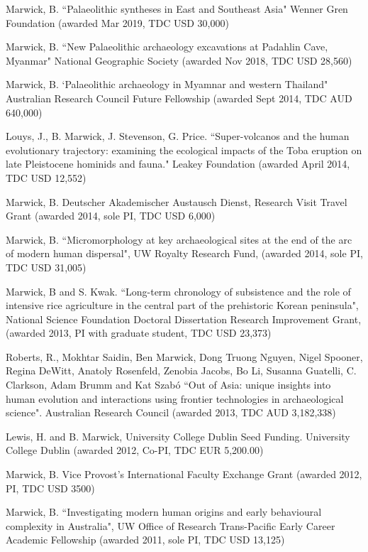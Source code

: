 \medskip

\ind  Marwick, B. ``Palaeolithic syntheses in East and Southeast Asia" Wenner Gren Foundation (awarded Mar 2019, TDC USD 30,000)

\ind  Marwick, B. ``New Palaeolithic archaeology excavations at Padahlin Cave, Myanmar" National Geographic Society (awarded Nov 2018, TDC USD 28,560)

\ind  Marwick, B. `Palaeolithic archaeology in Myamnar and western Thailand" Australian Research Council Future Fellowship (awarded Sept 2014, TDC AUD 640,000)

\ind  Louys, J., B. Marwick, J. Stevenson, G. Price. ``Super-volcanos and the human evolutionary trajectory: examining the ecological impacts of the Toba eruption on late Pleistocene hominids and fauna." Leakey Foundation (awarded April 2014, TDC USD 12,552)

\ind  Marwick, B. Deutscher Akademischer Austausch Dienst, Research Visit Travel Grant (awarded 2014, sole PI, TDC USD 6,000)

\ind  Marwick, B. ``Micromorphology at key archaeological sites at the end of the arc of modern human dispersal", UW Royalty Research Fund, (awarded 2014, sole PI, TDC USD 31,005)

\ind  Marwick, B and S. Kwak. ``Long-term chronology of subsistence and the role of intensive rice agriculture in the central part of the prehistoric Korean peninsula", National Science Foundation Doctoral Dissertation Research Improvement Grant, (awarded 2013,  PI with graduate student, TDC USD 23,373)

\ind  Roberts, R., Mokhtar Saidin, Ben Marwick, Dong Truong Nguyen, Nigel Spooner, Regina DeWitt, Anatoly Rosenfeld, Zenobia Jacobs, Bo Li, Susanna Guatelli, C. Clarkson, Adam Brumm and Kat Szabó ``Out of Asia: unique insights into human evolution and interactions using frontier technologies in archaeological science".  Australian Research Council (awarded 2013, TDC AUD 3,182,338)

\ind Lewis, H. and B. Marwick,  University College Dublin Seed Funding. University College Dublin (awarded 2012, Co-PI, TDC EUR 5,200.00) 

\ind Marwick, B. Vice Provost’s International Faculty Exchange Grant (awarded 2012, PI, TDC USD 3500)

\ind  Marwick, B. ``Investigating modern human origins and early behavioural complexity in Australia", UW Office of Research Trans-Pacific Early Career Academic Fellowship (awarded 2011, sole PI, TDC USD 13,125)

